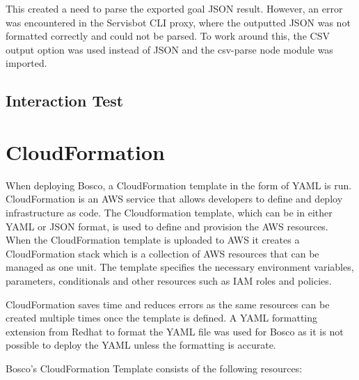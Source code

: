 \documentclass[12pt,a4paper,titlepage]{report}
\begin{document}
This created a need to parse the exported goal JSON result. However, an error was encountered in the Servisbot CLI proxy, where the outputted JSON was not formatted correctly and could not be parsed. 
To work around this, the CSV output option was used instead of JSON and the csv-parse node module was imported.

\subsection{Interaction Test}

\section{CloudFormation}
When deploying Bosco, a  CloudFormation template in the form of YAML is run.  CloudFormation is an AWS service that allows developers to define and deploy infrastructure as code.
The Cloudformation template, which can be in either YAML or JSON format, is used to define and provision the AWS resources. When the CloudFormation template is uploaded to AWS it 
creates a CloudFormation stack which is a collection of AWS resources that can be managed as one unit. 
The template specifies the necessary environment variables, parameters, conditionals and other resources such as IAM roles and policies. 

CloudFormation saves time and reduces errors as the same resources can be created multiple times once the template is defined.
A YAML formatting extension from Redhat to format the YAML file was used for Bosco as it is not possible to deploy the YAML unless the formatting is accurate.

Bosco's CloudFormation Template consists of the following resources:
\end{document}
